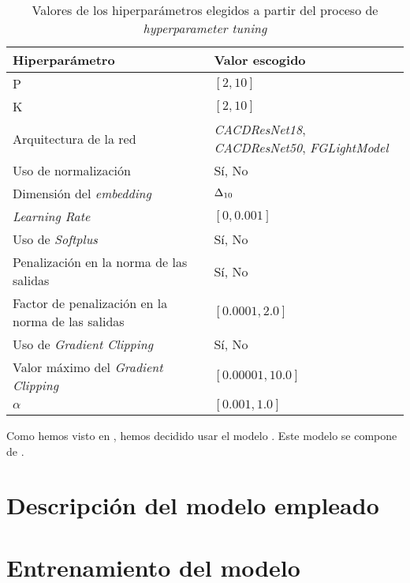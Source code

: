 \begin{table}[H]
\centering
\begin{tabular}{|l|l|}
    \hline
    \textbf{Hiperparámetro} & \textbf{Valor escogido} \\
    \hline

    P & $[2, 10]$ \\
    K & $[2, 10]$ \\
    Arquitectura de la red & \textit{CACDResNet18}, \textit{CACDResNet50}, \textit{FGLightModel} \\
    Uso de normalización & Sí, No \\
    Dimensión del \textit{embedding} & $\Delta_{10}$ \\
    \textit{Learning Rate} & $[0, 0.001]$ \\
    Uso de \textit{Softplus} & Sí, No \\
    Penalización en la norma de las salidas & Sí, No \\
    Factor de penalización en la norma de las salidas & $[0.0001, 2.0]$ \\
    Uso de \textit{Gradient Clipping} & Sí, No \\
    Valor máximo del \textit{Gradient Clipping} & $[0.00001, 10.0]$ \\
    $\alpha$ & $[0.001, 1.0]$ \\

    \hline


\end{tabular}
\caption{Valores de los hiperparámetros elegidos a partir del proceso de \textit{hyperparameter tuning}}
\label{table:hp_escogidos}
\end{table}

Como hemos visto en , hemos decidido usar el modelo . Este modelo se compone de .

\section{Descripción del modelo empleado} \label{isec:explicacion_modelo}

\section{Entrenamiento del modelo} \label{isec:entrenamiento_mejor_modelo}

